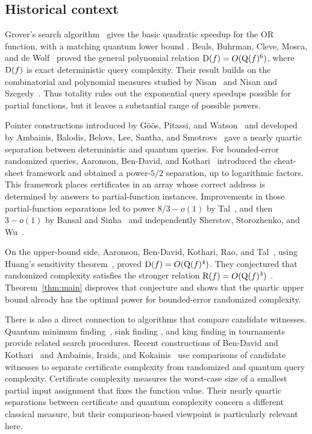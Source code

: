\subsection{Historical context}

Grover's search algorithm~\cite{Grover96} gives the basic quadratic
speedup for the OR function, with a matching quantum lower bound
\cite{BBBV97}. Beals, Buhrman, Cleve, Mosca, and de Wolf~\cite{BBCMW01}
proved the general polynomial relation $\mathrm D(f)=O(\mathrm Q(f)^6)$, where
$\mathrm D(f)$ is exact deterministic query complexity. Their result builds
on the combinatorial and polynomial measures studied by
Nisan~\cite{Nisan91} and Nisan and Szegedy~\cite{NisanSzegedy94}.
Thus totality rules out the exponential query speedups possible for
partial functions, but it leaves a substantial range of possible powers.

Pointer constructions introduced by G\"o\"os, Pitassi, and
Watson~\cite{GPW15} and developed by Ambainis, Balodis, Belovs, Lee,
Santha, and Smotrovs~\cite{ABBLSS17} gave a nearly quartic separation
between deterministic and quantum queries. For bounded-error randomized
queries, Aaronson, Ben-David, and Kothari~\cite{ABK16} introduced the
cheat-sheet framework and obtained a power-$5/2$ separation, up to
logarithmic factors. This framework places certificates in an array
whose correct address is determined by answers to partial-function
instances. Improvements in those partial-function separations led to
power $8/3-o(1)$ by Tal~\cite{Tal20}, and then $3-o(1)$ by Bansal
and Sinha~\cite{BS21} and independently Sherstov, Storozhenko, and
Wu~\cite{SSW23}.

On the upper-bound side, Aaronson, Ben-David, Kothari, Rao, and
Tal~\cite{ABKRT21}, using Huang's sensitivity theorem~\cite{Huang19},
proved $\mathrm D(f)=O(\mathrm Q(f)^4)$. They conjectured that randomized complexity
satisfies the stronger relation $\mathrm R(f)=O(\mathrm Q(f)^3)$
\cite[Conjecture~2]{ABKRT21}. Theorem~\ref{thm:main} disproves that
conjecture and shows that the quartic upper bound already has the
optimal power for bounded-error randomized complexity.

There is also a direct connection to algorithms that compare candidate
witnesses. Quantum minimum finding~\cite{DurrHoyer96}, sink finding
\cite{SYZ04}, and king finding in tournaments~\cite{MPS23} provide
related search procedures. Recent constructions of Ben-David and
Kothari~\cite{BK26} and Ambainis, Iraids, and Kokainis~\cite{AIK26}
use comparisons of candidate witnesses to separate certificate
complexity from randomized and quantum query complexity. Certificate
complexity measures the worst-case size of a smallest partial input
assignment that fixes the function value. Their nearly quartic
separations between certificate and quantum complexity concern a
different classical measure, but their comparison-based viewpoint is
particularly relevant here.

